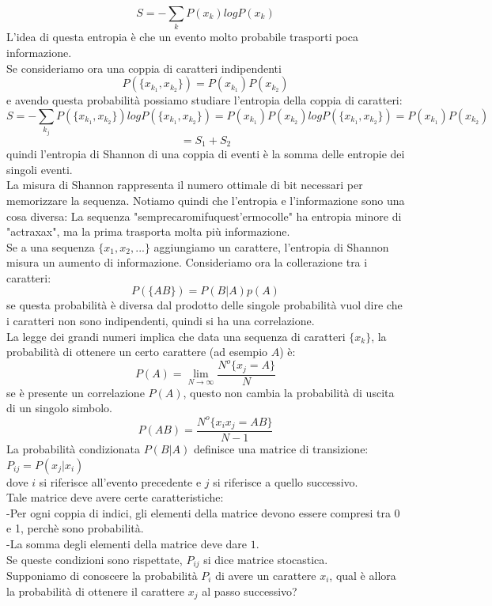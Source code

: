 \documentclass[12pt]{article}
\begin{document}
\begin{equation}
	S = -\sum_k P(x_k)log P(x_k)
\end{equation}
L'idea di questa entropia è che un evento molto probabile trasporti poca informazione. \\
Se consideriamo ora una coppia di caratteri indipendenti
$$
	P(\{x_{k_1}, x_{k_2}\}) = P(x_{k_1})P(x_{k_2})
$$
e avendo questa probabilità possiamo studiare l'entropia della coppia di caratteri:
$$
	S = -\sum_{k_j} P(\{x_{k_1}, x_{k_2}\})log P(\{x_{k_1}, x_{k_2}\}) = P(x_{k_1})P(x_{k_2}) log P(\{x_{k_1}, x_{k_2}\}) = P(x_{k_1})P(x_{k_2}) 
$$
$$
	= S_1 + S_2
$$
quindi l'entropia di Shannon di una coppia di eventi è la somma delle entropie dei singoli eventi. \\
La misura di Shannon rappresenta il numero ottimale di bit necessari per memorizzare la sequenza. Notiamo quindi che l'entropia e l'informazione sono una cosa diversa: La sequenza "semprecaromifuquest'ermocolle" ha entropia minore di "actraxax", ma la prima trasporta molta più informazione. \\
Se a una sequenza $\{x_1,x_2,...\}$ aggiungiamo un carattere, l'entropia di Shannon misura un aumento di informazione.
Consideriamo ora la collerazione tra i caratteri:
$$
	P(\{AB\}) = P(B|A)p(A)
$$
se questa probabilità è diversa dal prodotto delle singole probabilità vuol dire che i caratteri non sono indipendenti, quindi si ha una correlazione. \\
La legge dei grandi numeri implica che data una sequenza di caratteri $\{x_k\}$, la probabilità di ottenere un certo carattere (ad esempio $A$) è:
$$
	P(A) = \lim_{N\rightarrow \infty} \frac{N^o\{x_j = A\}}{N}
$$
se è presente un correlazione $P(A)$, questo non cambia la probabilità di uscita di un singolo simbolo. 
$$
	P(AB) = \frac{N^o\{x_ix_j = AB\}}{N-1}
$$
La probabilità condizionata $P(B|A)$ definisce una matrice di transizione: $P_{ij} = P(x_j|x_i)$ \\
dove $i$ si riferisce all'evento precedente e $j$ si riferisce a quello successivo. \\
Tale matrice deve avere certe caratteristiche: \\
-Per ogni coppia di indici, gli elementi della matrice devono essere compresi tra 0 e 1, perchè sono probabilità. \\
-La somma degli elementi della matrice deve dare $1$. \\
Se queste condizioni sono rispettate, $P_{ij}$ si dice matrice stocastica. \\
Supponiamo di conoscere la probabilità $P_i$ di avere un carattere $x_i$, qual è allora la probabilità di ottenere il carattere $x_j$ al passo successivo? \\
\end{document}
